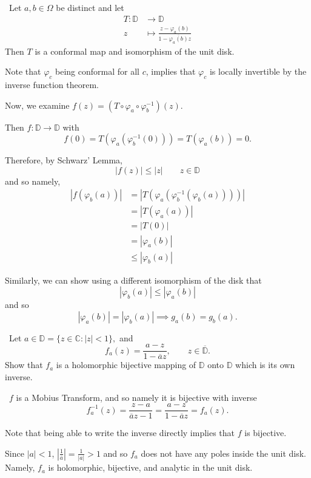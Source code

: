 \documentclass[12pt]{Homework}
\begin{document}
\begin{solution}$\,$
Let $a,b\in\Omega$ be distinct and let \begin{align*}
    T:\mathbb{D}&\to\mathbb{D}\\
    z&\mapsto\frac{z-\varphi_a(b)}{1-\overline{\varphi_a(b)}z}
\end{align*} Then $T$ is a conformal map and isomorphism of the unit disk.

Note that $\varphi_c$ being conformal for all $c$, implies that $\varphi_c$ is locally invertible by the inverse function theorem. 

 Now, we examine $f(z)=(T\circ\varphi_a\circ\varphi_b^{-1})(z)$. 

Then $f:\mathbb{D}\to\mathbb{D}$ with $$f(0)=T(\varphi_a(\varphi_b^{-1}(0)))=T(\varphi_a(b))=0.$$

Therefore, by Schwarz' Lemma, $$|f(z)|\le|z|\qquad z\in\mathbb{D}$$ and so namely, \begin{align*}
    |f(\varphi_b(a))|&=|T(\varphi_a(\varphi_b^{-1}(\varphi_b(a))))|\\
    &=|T(\varphi_a(a))|\\
    &=|T(0)|\\
    &=|\varphi_a(b)|\\
    &\le|\varphi_b(a)|
\end{align*}

Similarly, we can show using a different isomorphism of the disk that $$|\varphi_b(a)|\le|\varphi_a(b)|$$ and so $$|\varphi_a(b)|=|\varphi_b(a)|\implies g_a(b)=g_b(a).$$
\end{solution}
\newpage





\begin{problem} $\,$
Let $a\in\mathbb{D}=\{z\in\mathbb{C}:|z|<1\},$ and $$f_a(z)=\frac{a-z}{1-\overline{a}z},\qquad z\in\overline{\mathbb{D}}.$$ Show that $f_a$ is a holomorphic bijective mapping of $\mathbb{D}$  onto $\mathbb{D}$ which is its own inverse.
\end{problem}


\begin{solution}$\,$
$f$ is a Mobius Transform, and so namely it is bijective with inverse $$f_a^{-1}(z)=\frac{z-a}{\overline{a}z-1}=\frac{a-z}{1-\overline{a}z}=f_a(z).$$

Note that being able to write the inverse directly implies that $f$ is bijective. 

Since $|a|<1$, $\left|\frac{1}{\overline{a}}\right|=\frac{1}{|a|}>1$ and so $f_a$ does not have any poles inside the unit disk. Namely, $f_a$ is holomorphic, bijective, and analytic in the unit disk.
\end{solution}
\end{document}
